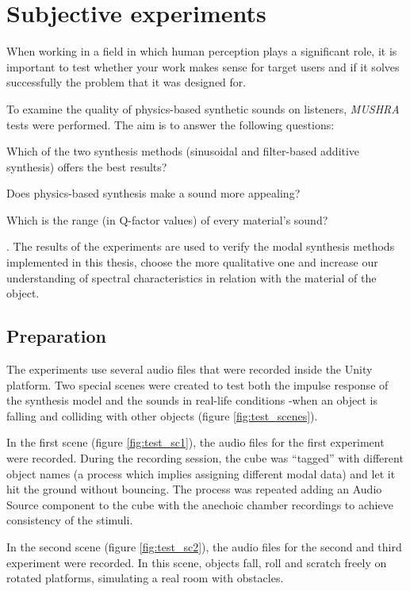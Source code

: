 \chapter{Subjective experiments}\label{ch:tests}
When working in a field in which human perception plays a significant role, it is important to test whether your work makes sense for target users and if it solves successfully the problem that it was designed for.

To examine the quality of physics-based synthetic sounds on listeners,  \textit{MUSHRA}\cite{series2014method} tests were performed. The aim is to answer the following questions: \begin{inparaenum}[1)]
\item Which of the two synthesis methods (sinusoidal and filter-based additive synthesis) offers the best results? 
\item Does physics-based synthesis make a sound more appealing?
\item Which is the range (in Q-factor values) of every material's sound?
\end{inparaenum}.
The results of the experiments are used to verify the modal synthesis methods implemented in this thesis, choose the more qualitative one and increase our understanding of spectral characteristics in relation with the material of the object. 

\section{Preparation}
The experiments use several audio files that were recorded inside the Unity\textsuperscript{\textregistered} platform. Two special scenes were created to test both the impulse response of the synthesis model and the sounds in real-life conditions -when an object is falling and colliding with other objects (figure \ref{fig:test_scenes}). 

In the first scene (figure \ref{fig:test_sc1}), the audio files for the first experiment were recorded. During the recording session, the cube was ``tagged'' with different object names (a process which implies assigning different modal data) and let it hit the ground without bouncing. The process was repeated adding an Audio Source component to the cube with the anechoic chamber recordings to achieve consistency of the stimuli.

In the second scene (figure \ref{fig:test_sc2}), the audio files for the second and third experiment were recorded. In this scene, objects fall, roll and scratch freely on rotated platforms, simulating a real room with obstacles.

